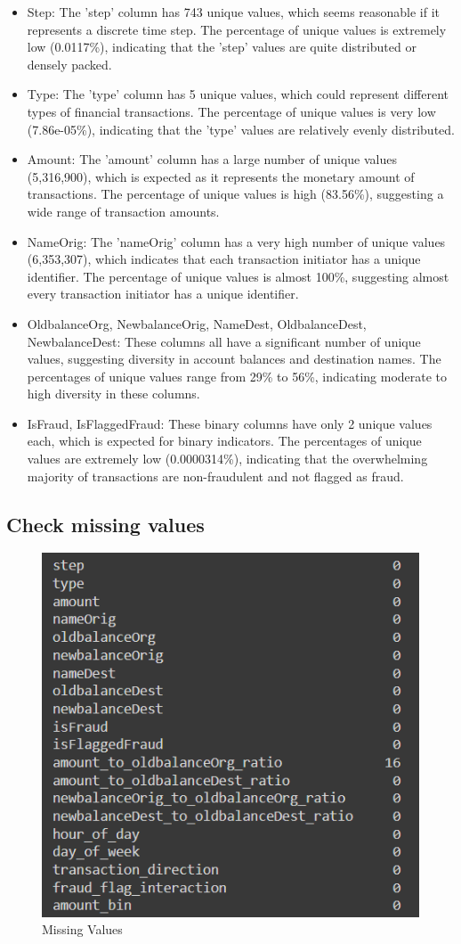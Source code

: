 \begin{itemize}
	\item Step: The 'step' column has 743 unique values, which seems reasonable if it represents a discrete time step. The percentage of unique values is extremely low (0.0117\%), indicating that the 'step' values are quite distributed or densely packed.
	\item Type: The 'type' column has 5 unique values, which could represent different types of financial transactions. The percentage of unique values is very low (7.86e-05\%), indicating that the 'type' values are relatively evenly distributed.
	\item Amount: The 'amount' column has a large number of unique values (5,316,900), which is expected as it represents the monetary amount of transactions. The percentage of unique values is high (83.56\%), suggesting a wide range of transaction amounts.
	\item NameOrig: The 'nameOrig' column has a very high number of unique values (6,353,307), which indicates that each transaction initiator has a unique identifier. The percentage of unique values is almost 100\%, suggesting almost every transaction initiator has a unique identifier.
	\item OldbalanceOrg, NewbalanceOrig, NameDest, OldbalanceDest, NewbalanceDest: These columns all have a significant number of unique values, suggesting diversity in account balances and destination names. The percentages of unique values range from 29\% to 56\%, indicating moderate to high diversity in these columns.
	\item IsFraud, IsFlaggedFraud: These binary columns have only 2 unique values each, which is expected for binary indicators. The percentages of unique values are extremely low (0.0000314\%), indicating that the overwhelming majority of transactions are non-fraudulent and not flagged as fraud.
\end{itemize}

\subsection{Check missing values}

\begin{figure}[H]
	\centering
	\includegraphics[width=0.7\linewidth]{chap4/missing_values}
	\caption{Missing Values}
	\label{fig:missingvalues}
\end{figure}

